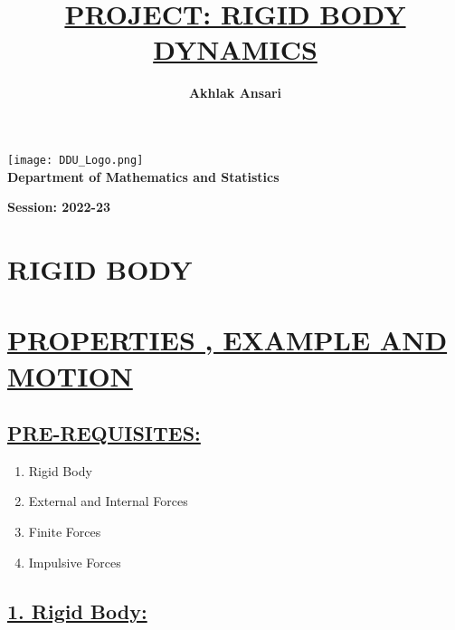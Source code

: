 \documentclass[12pt,a4paper]{article}
\title{{\bf \underline{PROJECT: RIGID BODY DYNAMICS}}}
\author{\bf Akhlak Ansari}
\begin{document}
    \maketitle

    \pagestyle{fancy}
    \fancyfoot{}
    \color{black}
    \rfoot{\thepage}
    \renewcommand{\footrulewidth}{1pt}

    \begin{center}
      
        \texttt{[image: DDU\_Logo.png]}\\[3mm]
        \textbf{ {\LARGE Department of Mathematics and Statistics}}
       
        \vspace{8.5cm}

        \textbf{Session: 2022-23}

    \end{center}

    \begin{center}
        \section*{\LARGE{{\bf RIGID BODY }}}
        \section*{\underline{\LARGE{{\bf PROPERTIES , EXAMPLE AND MOTION }}}}
    \end{center}

    \subsection*{\underline{PRE-REQUISITES:}}
    \begin{enumerate}
        \item Rigid Body
        \item External and Internal Forces
        \item Finite Forces
        \item Impulsive Forces
    \end{enumerate}

    
    \subsection*{{\bf \underline{1. Rigid Body:}}}
\end{document}
